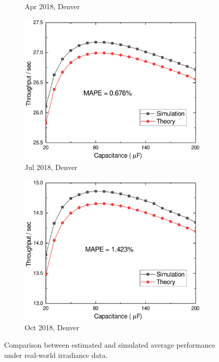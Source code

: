 \begin{figure}[H]
\begin{subfigure}{0.49\textwidth}
        \caption{Apr 2018, Denver}
    \end{subfigure}
    \par\bigskip
    \begin{subfigure}{0.49\textwidth}
        \centering
        \includegraphics[width=\textwidth]{figure/work1/CapDenvJul}
        \caption{Jul 2018, Denver}
    \end{subfigure}
    \begin{subfigure}{0.49\textwidth}
        \centering
        \includegraphics[width=\textwidth]{figure/work1/CapDenvOct}
        \caption{Oct 2018, Denver}
    \end{subfigure}
    \caption{Comparison between estimated and simulated average performance under real-world irradiance data.}
    \label{Figure:CapSizeReal}
\end{figure}


